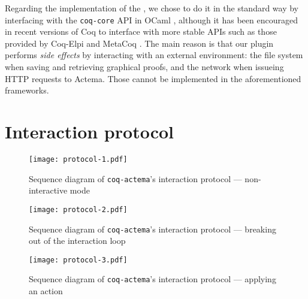 Regarding the implementation of the , we chose to do it in the
standard way by interfacing with the \texttt{coq-core} API in OCaml
, although it has been encouraged in recent versions of Coq to
interface with more stable APIs such as those provided by Coq-Elpi
 and MetaCoq . The main
reason is that our plugin performs \emph{side effects} by interacting with an
external environment: the file system when saving and retrieving graphical
proofs, and the network when issueing HTTP requests to Actema. Those cannot be
implemented in the aforementioned frameworks.

\section{Interaction protocol}

\begin{figure*}
  \texttt{[image: protocol-1.pdf]}
  \vspace{2em}
  \caption{Sequence diagram of \texttt{coq-actema}'s interaction protocol ---
  non-interactive mode}
\end{figure*}

\begin{figure*}
  \texttt{[image: protocol-2.pdf]}
  \vspace{2em}
  \caption{Sequence diagram of \texttt{coq-actema}'s interaction protocol ---
    breaking out of the interaction loop}
\end{figure*}

\begin{figure*}
  \texttt{[image: protocol-3.pdf]}
  \vspace{2em}
  \caption{Sequence diagram of \texttt{coq-actema}'s interaction protocol ---
    applying an action}
\end{figure*}


